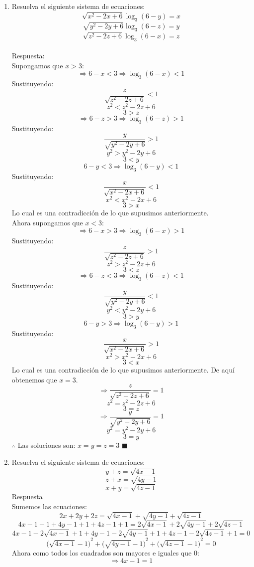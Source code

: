 \documentclass{book}
\begin{document}
\begin{enumerate}
    \item Resuelva el siguiente sistema de ecuaciones:
          $$\sqrt{x^2-2x+6}\log_{3}{(6-y)}=x$$
          $$\sqrt{y^2-2y+6}\log_{3}{(6-z)}=y$$
          $$\sqrt{z^2-2z+6}\log_{3}{(6-x)}=z$$\\
          Respuesta:\\
          Supongamos que $x>3$:
          $$\Rightarrow 6-x<3\Rightarrow \log_{3}(6-x)<1$$
          Sustituyendo:
          $$\frac{z}{\sqrt{z^2-2z+6}}<1$$
          $$z^2<z^2-2z+6$$
          $$3>z$$
          $$\Rightarrow 6-z>3\Rightarrow \log_{3}(6-z)>1$$
          Sustituyendo:
          $$\frac{y}{\sqrt{y^2-2y+6}}>1$$
          $$y^2>y^2-2y+6$$
          $$3<y$$
          $$6-y<3\Rightarrow\log_{3}(6-y)<1$$
          Sustituyendo:
          $$\frac{x}{\sqrt{x^2-2x+6}}<1$$
          $$x^2<x^2-2x+6$$
          $$3>x$$
          Lo cual es una contradicción de lo que supusimos anteriormente.\\
          Ahora supongamos que $x<3$:
          $$\Rightarrow 6-x>3\Rightarrow \log_{3}(6-x)>1$$
          Sustituyendo:
          $$\frac{z}{\sqrt{z^2-2z+6}}>1$$
          $$z^2>z^2-2z+6$$
          $$3<z$$
          $$\Rightarrow 6-z<3\Rightarrow \log_{3}(6-z)<1$$
          Sustituyendo:
          $$\frac{y}{\sqrt{y^2-2y+6}}<1$$
          $$y^2<y^2-2y+6$$
          $$3>y$$
          $$6-y>3\Rightarrow\log_{3}(6-y)>1$$
          Sustituyendo:
          $$\frac{x}{\sqrt{x^2-2x+6}}>1$$
          $$x^2>x^2-2x+6$$
          $$3<x$$
          Lo cual es una contradicción de lo que supusimos anteriormente. De aquí obtenemos que $x=3$.
          $$\Rightarrow\frac{z}{\sqrt{z^2-2z+6}}=1$$
          $$z^2=z^2-2z+6$$
          $$3=z$$
          $$\Rightarrow \frac{y}{\sqrt{y^2-2y+6}}=1$$
          $$y^2=y^2-2y+6$$
          $$3=y$$
          $\therefore$ Las soluciones son: $x=y=z=3$ $\blacksquare$\\
    \item Resuelva el siguiente sistema de ecuaciones:
          $$y+z=\sqrt{4x-1}$$
          $$z+x=\sqrt{4y-1}$$
          $$x+y=\sqrt{4z-1}$$
          Respuesta\\
          Sumemos las ecuaciones:
          $$2x+2y+2z=\sqrt{4x-1}+\sqrt{4y-1}+\sqrt{4z-1}$$
          $$4x-1+1+4y-1+1+4z-1+1=2\sqrt{4x-1}+2\sqrt{4y-1}+2\sqrt{4z-1}$$
          $$4x-1-2\sqrt{4x-1}+1+4y-1-2\sqrt{4y-1}+1+4z-1-2\sqrt{4z-1}+1=0$$
          $${\big(\sqrt{4x-1}-1\big)}^2+{\big(\sqrt{4y-1}-1\big)}^2+{\big(\sqrt{4z-1}-1\big)}^2=0$$
          Ahora como todos los cuadrados son mayores e iguales que 0:
          $$\Rightarrow 4x-1=1$$

\end{enumerate}
\end{document}

